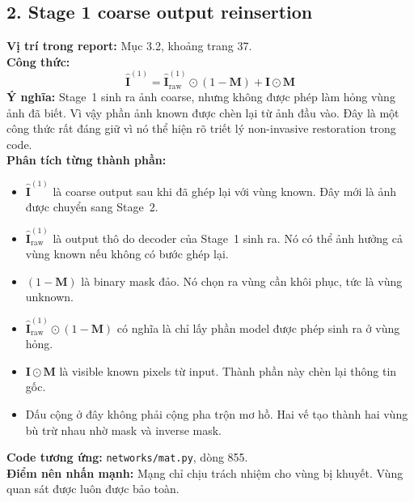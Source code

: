 \documentclass[12pt,a4paper]{article}
\begin{document}
\subsection*{2. Stage 1 coarse output reinsertion}
\textbf{Vị trí trong report:} Mục 3.2, khoảng trang 37.\\
\textbf{Công thức:}
\[
\hat{\mathbf{I}}^{(1)} = \hat{\mathbf{I}}_{\mathrm{raw}}^{(1)} \odot (1-\mathbf{M}) + \mathbf{I} \odot \mathbf{M}
\]
\textbf{Ý nghĩa:} Stage~1 sinh ra ảnh coarse, nhưng không được phép làm hỏng vùng ảnh đã biết. Vì vậy phần ảnh known được chèn lại từ ảnh đầu vào. Đây là một công thức rất đáng giữ vì nó thể hiện rõ triết lý non-invasive restoration trong code.\\
\textbf{Phân tích từng thành phần:}
\begin{itemize}[leftmargin=1.5em]
\item $\hat{\mathbf{I}}^{(1)}$ là coarse output sau khi đã ghép lại với vùng known. Đây mới là ảnh được chuyển sang Stage~2.
\item $\hat{\mathbf{I}}_{\mathrm{raw}}^{(1)}$ là output thô do decoder của Stage~1 sinh ra. Nó có thể ảnh hưởng cả vùng known nếu không có bước ghép lại.
\item $(1-\mathbf{M})$ là binary mask đảo. Nó chọn ra vùng cần khôi phục, tức là vùng unknown.
\item $\hat{\mathbf{I}}_{\mathrm{raw}}^{(1)} \odot (1-\mathbf{M})$ có nghĩa là chỉ lấy phần model được phép sinh ra ở vùng hỏng.
\item $\mathbf{I}\odot\mathbf{M}$ là visible known pixels từ input. Thành phần này chèn lại thông tin gốc.
\item Dấu cộng ở đây không phải cộng pha trộn mơ hồ. Hai vế tạo thành hai vùng bù trừ nhau nhờ mask và inverse mask.
\end{itemize}
\textbf{Code tương ứng:} \texttt{networks/mat.py}, dòng 855.\\
\textbf{Điểm nên nhấn mạnh:} Mạng chỉ chịu trách nhiệm cho vùng bị khuyết. Vùng quan sát được luôn được bảo toàn.
\end{document}
